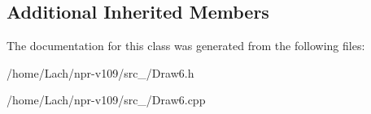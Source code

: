 \subsection*{Additional Inherited Members}


The documentation for this class was generated from the following files\+:\begin{DoxyCompactItemize}
\item 
/home/\+Lach/npr-\/v109/src\+\_/Draw6.\+h\item 
/home/\+Lach/npr-\/v109/src\+\_/Draw6.\+cpp\end{DoxyCompactItemize}

